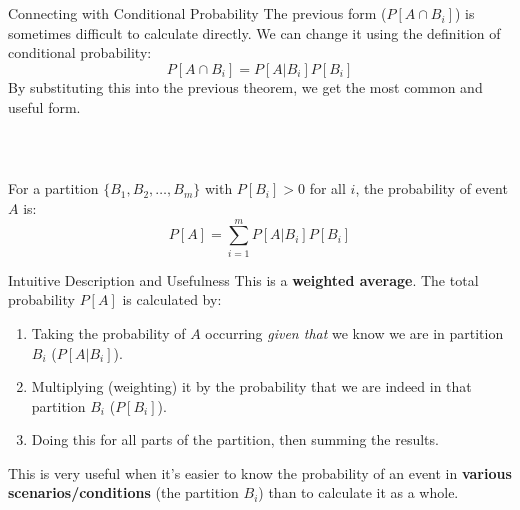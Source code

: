 \begin{frame}[t]
\frametitle{\ }
    \begin{block}{Connecting with Conditional Probability}
        The previous form ($P[A \cap B_i]$) is sometimes difficult to calculate directly. We can change it using the definition of conditional probability:
        \[ P[A \cap B_i] = P[A|B_i] P[B_i] \]
        By substituting this into the previous theorem, we get the most common and useful form.
    \end{block}
\end{frame}

\begin{frame}[t]
\frametitle{\ }
\vspace{-7mm}
\footnotesize
    \begin{Teorema}
        For a partition $\{B_1, B_2, \dots, B_m\}$ with $P[B_i] > 0$ for all $i$, the probability of event $A$ is:
        \[
        P[A] = \sum_{i=1}^{m} P[A|B_i] P[B_i]
        \]
    \end{Teorema}

    \begin{exampleblock}{Intuitive Description and Usefulness}
     This is a \textbf{weighted average}. The total probability $P[A]$ is calculated by:
     \begin{enumerate}
         \item Taking the probability of $A$ occurring \textit{given that} we know we are in partition $B_i$ ($P[A|B_i]$).
         \item Multiplying (weighting) it by the probability that we are indeed in that partition $B_i$ ($P[B_i]$).
         \item Doing this for all parts of the partition, then summing the results.
     \end{enumerate}
     This is very useful when it's easier to know the probability of an event in \textbf{various scenarios/conditions} (the partition $B_i$) than to calculate it as a whole.
    \end{exampleblock}
\end{frame}

